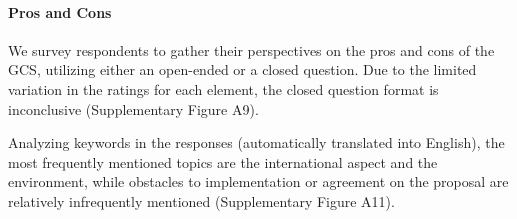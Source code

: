 \paragraph{Pros and Cons}\label{subsubsec:pros_cons} %

We survey respondents to gather their perspectives on the pros and cons of the GCS, utilizing either an open-ended or a closed question. 
Due to the limited variation in the ratings for each element, the closed question format is inconclusive (Supplementary Figure A9). %

Analyzing keywords in the responses (automatically translated into English), the most frequently mentioned topics are the international aspect and the environment, 
while obstacles to implementation or agreement on the proposal are relatively infrequently mentioned (Supplementary Figure A11). 

